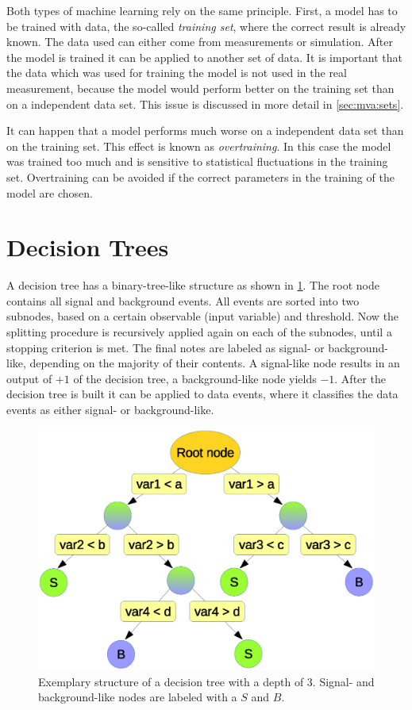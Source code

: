 Both types of machine learning rely on the same principle.
First, a model has to be trained with data, the so-called \emph{training set}, where the correct result is already known.
The data used can either come from measurements or simulation.
After the model is trained it can be applied to another set of data.
It is important that the data which was used for training the model is not used in the real measurement, because
the model would perform better on the training set than on a independent data set.
This issue is discussed in more detail in \cref{sec:mva:sets}.

It can happen that a model performs much worse on a independent data set than on the training set.
This effect is known as \emph{overtraining}.
In this case the model was trained too much and is sensitive to statistical fluctuations in the training set.
Overtraining can be avoided if the correct parameters in the training of the model are chosen.

\section{Decision Trees}\label{sec:bdt:decision_trees}

A decision tree has a binary-tree-like structure as shown in \cref{fig:bdt:dt}.
The root node contains all signal and background events.
All events are sorted into two subnodes, based on a certain observable (input variable) and threshold.
Now the splitting procedure is recursively applied again on each of the subnodes, until a
stopping criterion is met.
The final notes are labeled as signal- or background-like, depending on the majority of their contents.
A signal-like node results in an output of $+1$ of the decision tree, a background-like node yields $-1$.
After the decision tree is built it can be applied to data events, where it classifies the data events as either
signal- or background-like.

\begin{figure}[htb]
    \begin{center}
        \includegraphics[width=0.8\linewidth]{./figures/bdts/DT.eps}
        \caption{Exemplary structure of a decision tree with a depth of $3$.
                 Signal- and background-like nodes are labeled with a $S$ and $B$.}\label{fig:bdt:dt}
    \end{center}
\end{figure}

